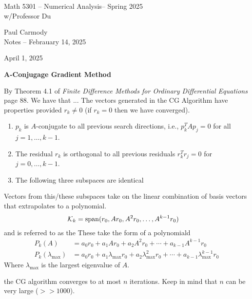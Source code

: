 \documentclass[10pt,a4paper]{report}
\newcommand{\CLASSNAME}{Math 5301 -- Numerical Analysis}
\newcommand{\STUDENTNAME}{Paul Carmody}
\newcommand{\ASSIGNMENT}{Notes }
\newcommand{\DUEDATE}{Febrauary 14, 2025}
\newcommand{\SEMESTER}{Spring 2025}
\begin{document}
\begin{center}
	\Large{\CLASSNAME -- \SEMESTER} \\
	\large{ w/Professor Du}
\end{center}
\begin{center}
	\STUDENTNAME \\
	\ASSIGNMENT -- \DUEDATE\\
\end{center} 

April 1, 2025

\textbf{A-Conjugage Gradient Method}

\begin{description}
	\item By Theorem 4.1  of \textit{Finite Difference Methods for Ordinary Differential Equations} page 88.  We have that ... The vectors generated in the CG Algorithm have properties provided $r_k \ne 0$ (if $r_k=0$ then we have converged).
	\begin{enumerate}
		\item $p_k$ is $A$-conjugate to all previous search directions, i.e., $p_k^T Ap_j =0$ for all $j=1,\dots,k-1$.
		\item The residual $r_k$ is orthogonal to all previous residuals $r_k^Tr_j=0$ for $j=0,\dots, k-1$.
		\item The following three subspaces are identical
	\end{enumerate}
	
	\item Vectors from this/these subspaces take on the linear combination of basis vectors that extrapolates to a polynomial.
	\begin{align*}
		\mathcal{K}_k &=  \operatorname{span}(r_0, Ar_0, A^2r_0, \dots, A^{k-1}r_0)
	\end{align*}and is referred to as the   These take the form of a polynomiald
	\begin{align*}
		P_k(A) &= a_0r_0+a_1Ar_0+a_2A^2r_0+\cdots+a_{k-1}A^{k-1}r_0 \\
		P_k(\lambda_{\max}) &= a_0r_0+a_1\lambda_{\max}r_0+a_2\lambda_{\max}^2r_0+\cdots+a_{k-1}\lambda_{\max}^{k-1}r_0 
	\end{align*}Where $\lambda_{\max}$ is the largest eigenvalue of $A$.
	
	\item the CG algorithm converges to at most $n$ iterations.  Keep in mind that $n$ can be very large ($>> 1000$).
	
\end{description}
\end{document}
